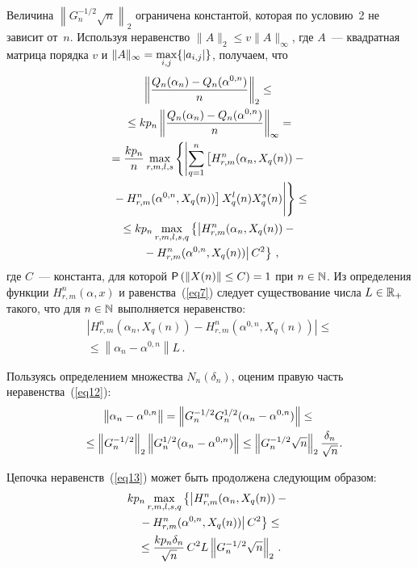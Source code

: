 \begin{multicols}{2}
Величина $\left\|G^{-1/2}_n\sqrt{n}\right\|_2$ ограничена константой, которая по 
условию~2 не зависит от~$n$. Используя неравенство $\|A\|_2\leq v\|A\|_{\infty}$, где 
$A$~--- квадратная матрица порядка $v$ и $\|A\|_{\infty}\hm= \max\limits_{i,j}\{|a_{i,j}|\}$, 
получаем, что
\begin{multline}
\left\|\fr{Q_n(\alpha_n)-Q_n(\alpha^{0,n})}{n}\right\|_2\leq{}\\
{}\leq kp_n\left\|
\fr{Q_n(\alpha_n)-Q_n(\alpha^{0,n})}{n}\right\|_{\infty}={}\\
{}=\fr{kp_n}{n}\max\limits_{r,m,l,s}\left\{\left|\sum\limits_{q=1}^n
\left[H^n_{r,m}(\alpha_n, X_q(n))-{}\right.\right.\right.\\
\left.\left.\left.{}-H^n_{r,m}(\alpha^{0,n}, X_q(n)) \right] 
X_q^l(n)X_q^s(n)\vphantom{\sum\limits_{q=1}^n}\right|\right\}\leq{}\\
{}\leq kp_n\max\limits_{r,m,l,s,q}\left\{\left|H^n_{r,m}(\alpha_n, X_q(n))-{}\right.\right.\\
\left.\left.{}-H^n_{r,m} (\alpha^{0,n}, X_q(n))\right|C^2\right\}\,,
\label{eq13}
\end{multline}
где $C$~--- константа, для которой $\p\left(\|X(n)\|\hm\leq C\right)=1$ при $n\hm\in\N$. 
Из определения функции $H^n_{r,m}(\alpha,x)$ и равенства~(\ref{eq7}) 
следует существование числа $L\hm\in\R_+$ такого, что для $n\hm\in\N$ выполняется неравенство:
\begin{multline}
\left|H^n_{r,m}(\alpha_n, X_q(n))-H^n_{r,m}(\alpha^{0,n}, X_q(n))\right|\leq{}\\
{}\leq
\left\|\alpha_n-\alpha^{0,n}\right\|L\,.\label{eq12}
\end{multline}

Пользуясь определением множества $N_n(\delta_n)$, оценим правую часть неравенства~(\ref{eq12}):
\begin{multline*}
\left\|\alpha_n-\alpha^{0,n}\right\|=\left\|G_n^{-1/2}G_n^{1/2}(\alpha_n-\alpha^{0,n})\right\|\leq{}\\
\!{}\leq\left\|G_n^{-1/2}\right\|_2\left\|G_n^{1/2}(\alpha_n-\alpha^{0,n})\right\|\leq \left\|G_n^{-1/2}\sqrt{n}\right\|_2\frac{\delta_n}{\sqrt{n}}.\hspace*{-7.18407pt}
\end{multline*}

Цепочка неравенств~(\ref{eq13}) может быть продолжена следующим образом:
\begin{multline}
kp_n \max\limits_{r,m,l,s,q}\left\{\left|H^n_{r,m}(\alpha_n, X_q(n))-{}\right.\right.\\
\left.\left.{}-
H^n_{r,m}(\alpha^{0,n}, X_q(n))\right|C^2\right\}\leq{}\\
{}\leq\displaystyle\frac{\displaystyle kp_n\delta_n\mathstrut}{\displaystyle \sqrt{n}\mathstrut} \,C^2L\left\|G_n^{-1/2}\sqrt{n}\right\|_2\,.
\label{eq161}
\end{multline}


\end{multicols}
